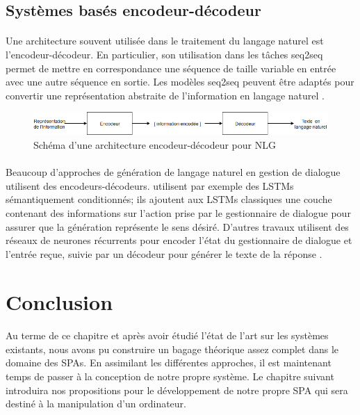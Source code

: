 \subsection{Systèmes basés encodeur-décodeur}
\paragraph{}
Une architecture souvent utilisée dans le traitement du langage naturel est l'encodeur-décodeur. En particulier, son utilisation dans les tâches seq2seq permet de mettre en correspondance une séquence de taille variable en entrée avec une autre séquence en sortie. Les modèles seq2seq peuvent être adaptés pour convertir une représentation abstraite de l'information en langage naturel \cite {Ferreira2017}.\newline
\begin{figure}[H]
	\centering
	\includegraphics[width=.95\linewidth]{images/NLG/Encoder.png} 
	\caption{Schéma d'une architecture encodeur-décodeur pour NLG} 
\end{figure}
\paragraph{}
Beaucoup d'approches de génération de langage naturel en gestion de dialogue utilisent des encodeurs-décodeurs. \citep{Wen2015} utilisent par exemple des LSTMs sémantiquement conditionnés; ils ajoutent aux LSTMs classiques une couche contenant des informations sur l'action prise par le gestionnaire de dialogue pour assurer que la génération représente le sens désiré. D'autres travaux utilisent des réseaux de neurones récurrents pour encoder l'état du gestionnaire de dialogue et l'entrée reçue, suivie par un décodeur pour générer le texte de la réponse \citep{Sordoni2015,Serban2016,Goyal2016}.
\section{Conclusion}
\paragraph{}
Au terme de ce chapitre et après avoir étudié l'état de l'art sur les systèmes existants, nous avons pu construire un bagage théorique assez complet dans le domaine des SPAs. En assimilant les différentes approches, il est maintenant temps de passer à la conception de notre propre système. Le chapitre suivant introduira nos propositions pour le développement de notre propre SPA qui sera destiné à la manipulation d'un ordinateur.